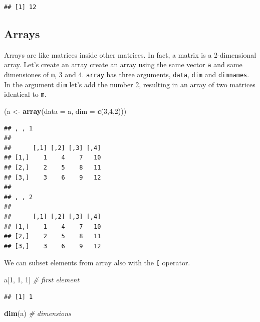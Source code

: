 \documentclass[12pt,graybox,envcountchap,sectrefs]{krantz}
\makeatletter
\newenvironment{Shaded}{\begin{snugshade}}{\end{snugshade}}
\newcommand{\KeywordTok}[1]{\textcolor[rgb]{0.13,0.29,0.53}{\textbf{#1}}}
\newcommand{\DataTypeTok}[1]{\textcolor[rgb]{0.13,0.29,0.53}{#1}}
\newcommand{\DecValTok}[1]{\textcolor[rgb]{0.00,0.00,0.81}{#1}}
\newcommand{\StringTok}[1]{\textcolor[rgb]{0.31,0.60,0.02}{#1}}
\newcommand{\CommentTok}[1]{\textcolor[rgb]{0.56,0.35,0.01}{\textit{#1}}}
\newcommand{\NormalTok}[1]{#1}
\newenvironment{kframe}{%
\medskip{}
\setlength{\fboxsep}{.8em}
 \def\at@end@of@kframe{}%
 \ifinner\ifhmode%
  \def\at@end@of@kframe{\end{minipage}}%
  \begin{minipage}{\columnwidth}%
 \fi\fi%
 \def\FrameCommand##1{\hskip\@totalleftmargin \hskip-\fboxsep
 \colorbox{shadecolor}{##1}\hskip-\fboxsep
     \hskip-\linewidth \hskip-\@totalleftmargin \hskip\columnwidth}%
 \MakeFramed {\advance\hsize-\width
   \@totalleftmargin\z@ \linewidth\hsize
   \@setminipage}}%
 {\par\unskip\endMakeFramed%
 \at@end@of@kframe}
\renewenvironment{Shaded}{\begin{kframe}}{\end{kframe}}
\theoremstyle{definition}
\theoremstyle{definition}
\theoremstyle{definition}
\theoremstyle{remark}
\makeatother
\begin{document}
\begin{verbatim}
## [1] 12
\end{verbatim}

\subsection{Arrays}\label{arrays}

Arrays are like matrices inside other matrices. In fact, a matrix is a
2-dimensional array. Let's create an array create an array using the
same vector \texttt{a} and same dimensiones of \texttt{m}, 3 and 4.
\texttt{array} has three arguments, \texttt{data}, \texttt{dim} and
\texttt{dimnames}. In the argument \texttt{dim} let's add the number 2,
resulting in an array of two matrices identical to \texttt{m}.

\begin{Shaded}
\begin{Highlighting}[]
\NormalTok{(a <-}\StringTok{ }\KeywordTok{array}\NormalTok{(}\DataTypeTok{data =}\NormalTok{ a, }\DataTypeTok{dim =} \KeywordTok{c}\NormalTok{(}\DecValTok{3}\NormalTok{,}\DecValTok{4}\NormalTok{,}\DecValTok{2}\NormalTok{)))}
\end{Highlighting}
\end{Shaded}

\begin{verbatim}
## , , 1
## 
##      [,1] [,2] [,3] [,4]
## [1,]    1    4    7   10
## [2,]    2    5    8   11
## [3,]    3    6    9   12
## 
## , , 2
## 
##      [,1] [,2] [,3] [,4]
## [1,]    1    4    7   10
## [2,]    2    5    8   11
## [3,]    3    6    9   12
\end{verbatim}

We can subset elements from array also with the \texttt{{[}} operator.

\begin{Shaded}
\begin{Highlighting}[]
\NormalTok{a[}\DecValTok{1}\NormalTok{, }\DecValTok{1}\NormalTok{, }\DecValTok{1}\NormalTok{] }\CommentTok{# first element}
\end{Highlighting}
\end{Shaded}

\begin{verbatim}
## [1] 1
\end{verbatim}

\begin{Shaded}
\begin{Highlighting}[]
\KeywordTok{dim}\NormalTok{(a)     }\CommentTok{# dimensions}
\end{Highlighting}
\end{Shaded}
\end{document}
